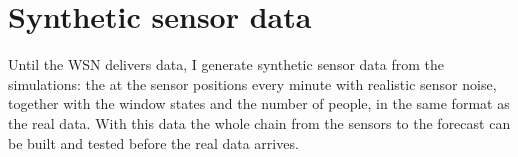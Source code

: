 \section{Synthetic sensor data}
Until the WSN delivers data, I generate synthetic sensor data from the simulations: the \cotwo{} at the sensor
positions every minute with realistic sensor noise, together with the window states and the number of people, in
the same format as the real data. With this data the whole chain from the sensors to the forecast can be built and
tested before the real data arrives. 
